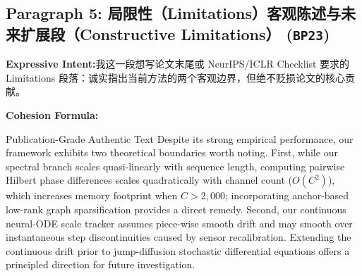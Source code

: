 \subsection*{Paragraph 5: 局限性（Limitations）客观陈述与未来扩展段（Constructive Limitations） (\texttt{BP23})}
\noindent\textbf{Expressive Intent:}\enspace 我这一段想写论文末尾或 NeurIPS/ICLR Checklist 要求的 Limitations 段落：诚实指出当前方法的两个客观边界，但绝不贬损论文的核心贡献。\par
\noindent\textbf{Cohesion Formula:}\par\vspace{4pt}
\begin{ExampleBox}{Publication-Grade Authentic Text}
Despite its strong empirical performance, our framework exhibits two theoretical boundaries worth noting. First, while our spectral branch scales quasi-linearly with sequence length, computing pairwise Hilbert phase differences scales quadratically with channel count ($O(C^2)$), which increases memory footprint when $C > 2,000$; incorporating anchor-based low-rank graph sparsification provides a direct remedy. Second, our continuous neural-ODE scale tracker assumes piece-wise smooth drift and may smooth over instantaneous step discontinuities caused by sensor recalibration. Extending the continuous drift prior to jump-diffusion stochastic differential equations offers a principled direction for future investigation.
\end{ExampleBox}
